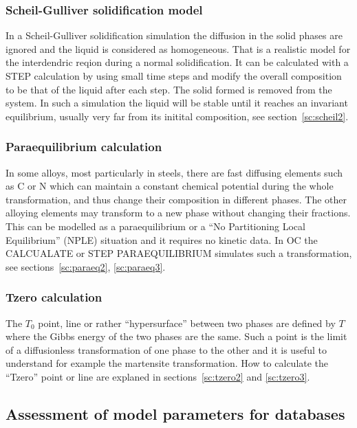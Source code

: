 \documentclass[11pt]{article}
\begin{document}
\subsubsection{Scheil-Gulliver solidification model}\label{sc:scheil1}

In a Scheil-Gulliver solidification simulation the diffusion in the
solid phases are ignored and the liquid is considered as homogeneous.
That is a realistic model for the interdendric reqion during a normal
solidification.  It can be calculated with a STEP calculation by using
small time steps and modify the overall composition to be that of the
liquid after each step.  The solid formed is removed from the system.
In such a simulation the liquid will be stable until it reaches an
invariant equilibrium, usually very far from its initital composition,
see section~\ref{sc:scheil2}.

\subsubsection{Paraequilibrium calculation}\label{sc:paraeq1}

In some alloys, most particularly in steels, there are fast diffusing
elements such as C or N which can maintain a constant chemical
potential during the whole transformation, and thus change their
composition in different phases.  The other alloying elements may
transform to a new phase without changing their fractions.  This can
be modelled as a paraequilibrium or a ``No Partitioning Local
Equilibrium'' (NPLE) situation and it requires no kinetic data.  In OC
the CALCUALATE or STEP PARAEQUILIBRIUM simulates such a
transformation, see sections~\ref{sc:paraeq2}, \ref{sc:paraeq3}.

\subsubsection{Tzero calculation}\label{sc:tzero1}

The $T_0$ point, line or rather ``hypersurface'' between two phases
are defined by $T$ where the Gibbs energy of the two phases are the
same.  Such a point is the limit of a diffusionless transformation of
one phase to the other and it is useful to understand for example the
martensite transformation.  How to calculate the ``Tzero'' point or
line are explaned in sections~\ref{sc:tzero2} and \ref{sc:tzero3}.

\subsection{Assessment of model parameters for databases}
\end{document}
